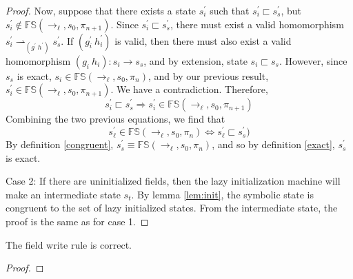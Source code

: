 \begin{proof}

Now, suppose that there exists a state $s_i^\prime$ such that $s_i^\prime \sqsubset s_s^\prime$, but $s_i^\prime \notin \mathbb{FS}(\rightarrow_{\ell},s_0,\pi_{n+1})$. Since $s_i^\prime \sqsubset s_s^\prime$, there must exist a valid homomorphism $s_i^\prime \rightharpoonup_{(g^\prime\ h^\prime)} s_s^\prime$. If $(g_i^\prime\ h_i^\prime)$ is valid, then there must also exist a valid homomorphism $(g_i\ h_i) : s_i \rightarrow s_s$, and by extension, state $s_i \sqsubset s_s$. However, since $s_s$ is exact, $s_i \in \mathbb{FS}(\rightarrow_{\ell},s_0,\pi_{n})$, and by our previous result, $s_i^\prime \in \mathbb{FS}(\rightarrow_{\ell},s_0,\pi_{n+1})$. We have a contradiction. Therefore, $$s_i^\prime \sqsubset s_s^\prime \Rightarrow s_i^\prime \in \mathbb{FS}(\rightarrow_{\ell},s_0,\pi_{n+1})$$ Combining the two previous equations, we find that 
$$s_\ell^\prime \in \mathbb{FS}(\rightarrow_{\ell},s_0,\pi_n) \Leftrightarrow s_\ell^\prime \sqsubset s_s^\prime)$$
By definition \ref{congruent}, $s_s^\prime \equiv \mathbb{FS}(\rightarrow_{\ell},s_0,\pi_n)$, and so by definition \ref{exact}, $s_s^\prime$ is exact.

Case 2: If there are uninitialized fields, then the lazy initialization machine will make an intermediate state $s_t$. By lemma \ref{lem:init}, the symbolic state is congruent to the set of lazy initialized states. From the intermediate state, the proof is the same as for case 1.
\end{proof}

\begin{lemma}
The field write rule is correct.
\end{lemma}
\begin{proof}
\end{proof}

